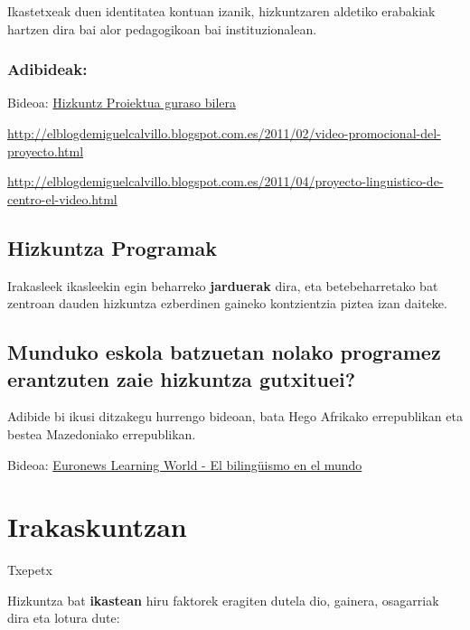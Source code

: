 \documentclass[
]{book}
\begin{document}
Ikastetxeak duen identitatea kontuan izanik, hizkuntzaren aldetiko erabakiak hartzen dira bai alor pedagogikoan bai instituzionalean.

\hypertarget{adibideak}{%
\subsubsection{Adibideak:}\label{adibideak}}

Bideoa: \href{http://www.youtube.com/embed/iFEjAhnv3ys?rel=0}{Hizkuntz Proiektua guraso bilera}

\url{http://elblogdemiguelcalvillo.blogspot.com.es/2011/02/video-promocional-del-proyecto.html}

\url{http://elblogdemiguelcalvillo.blogspot.com.es/2011/04/proyecto-linguistico-de-centro-el-video.html}

\hypertarget{hizkuntza-programak}{%
\subsection{Hizkuntza Programak}\label{hizkuntza-programak}}

Irakasleek ikasleekin egin beharreko \textbf{jarduerak }dira, eta betebeharretako bat zentroan dauden hizkuntza ezberdinen gaineko kontzientzia piztea izan daiteke.

\hypertarget{munduko-eskola-batzuetan-nolako-programez-erantzuten-zaie-hizkuntza-gutxituei}{%
\subsection{Munduko eskola batzuetan nolako programez erantzuten zaie hizkuntza gutxituei?}\label{munduko-eskola-batzuetan-nolako-programez-erantzuten-zaie-hizkuntza-gutxituei}}

Adibide bi ikusi ditzakegu hurrengo bideoan, bata Hego Afrikako errepublikan eta bestea Mazedoniako errepublikan.

Bideoa: \href{http://www.youtube.com/embed/nPUMvUBuX00?rel=0}{Euronews Learning World - El bilingüismo en el mundo}

\hypertarget{irakaskuntzan}{%
\section{Irakaskuntzan}\label{irakaskuntzan}}

Txepetx

Hizkuntza bat \textbf{ikastean }hiru faktorek eragiten dutela dio, gainera, osagarriak dira eta lotura dute:
\end{document}
